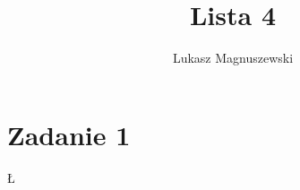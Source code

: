 \documentclass{article}
\title{Lista 4}
\author{Lukasz Magnuszewski}
\date{\vspace{-5ex}}
\begin{document}
\maketitle

\section*{Zadanie 1}
Ł
\end{document}
